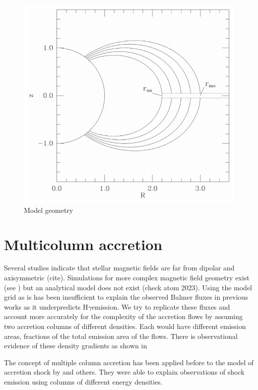 \documentclass[twocolumn,linenumbers]{aastex631}
\newcommand{\hgamma}{H$\gamma$}
\begin{document}
\begin{figure}
    \centering
    \includegraphics[width=0.75\linewidth]{figures/geometry.png}
    \caption{Model geometry}
    \label{fig:model_geometry}
\end{figure}

\section{Multicolumn accretion}

Several studies indicate that stellar magnetic fields are far from dipolar and axisymmetric (cite). Simulations for more complex magnetic field geometry exist (see \citet{romanova2003}) but an analytical model does not exist (check atom 2023). Using the model grid as is has been insufficient to explain the observed Balmer fluxes in previous works \citep{micolta2023} as it underpredicts \hgamma emission. We try to replicate these fluxes and account more accurately for the complexity of the accretion flows by assuming two accretion columns of different densities. Each would have different emission areas, fractions of the total emission area of the flows. There is observational evidence of these density gradients as shown in \citet{zhaohuan2024}

 The concept of multiple column accretion has been applied before to the model of accretion shock by \citet{pittman2022} and others. They were able to explain observations of shock emission using columns of different energy densities. 
\end{document}
